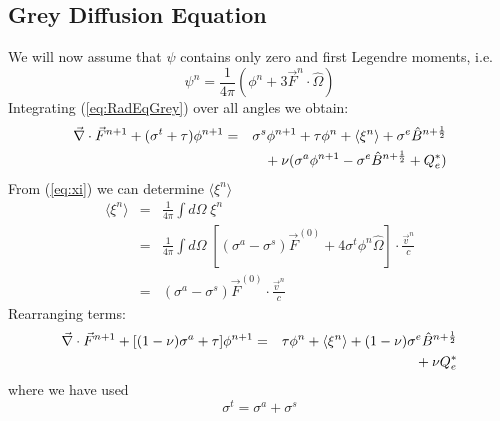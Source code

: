 \documentclass{article}
\newcommand{\Bnphlf}{\ensuremath{\hat{B}^{n+\frac{1}{2}}}}
\begin{document}
\subsection{Grey Diffusion Equation}

We will now assume that $\psi$ contains only zero and first Legendre moments,
i.e.\ 
\begin{equation}
        \psi^{n} = \frac{1}{4\pi} \left(
                        \phi^{n} + 3 \vec{F}^{n} \cdot \hat{\Omega}
                   \right)
\end{equation}
Integrating (\ref{eq:RadEqGrey}) over all angles
we obtain:
\begin{eqnarray}
\del \cdot \vec{F}^{n+1} + (\sigma^{t} + \tau) \phi^{n+1}
        &=& \sigma^{s}\phi^{n+1} + \tau \phi^{n}
        + \langle \xi^{n} \rangle
        + \sigma^{e} \Bnphlf 
        \nonumber \\
        & & \mbox{}
        + \nu (\sigma^{a}\phi^{n+1} - \sigma^{e}\Bnphlf + Q_{e}^{*})
\end{eqnarray}
From (\ref{eq:xi}) we can determine $\langle \xi^{n} \rangle$
\begin{eqnarray}
        \langle \xi^{n} \rangle &=&
                \frac{1}{4\pi} \int d\Omega \; \xi^{n}
                \\
                &=& \frac{1}{4\pi} \int d\Omega \;
                    \left[ (\sigma^{a} - \sigma^{s}) \vec{F}^{(0)}
                        + 4 \sigma^{t} \phi^{n} \hat{\Omega} \right]
                                \cdot \frac{\vec{v}^{n}}{c}
                \\
                 &=& (\sigma^{a} - \sigma^{s}) \vec{F}^{(0)}
                        \cdot \frac{\vec{v}^{n}}{c}
\label{eq:l_xi_r}
\end{eqnarray}
Rearranging terms:
\begin{eqnarray}
\del \cdot \vec{F}^{n+1} + [(1 - \nu) \sigma^{a} + \tau ] \phi^{n+1}
        &=& \tau \phi^{n}
        + \langle \xi^{n} \rangle
        + (1 - \nu) \sigma^{e} \Bnphlf  
        \nonumber \\
        & & \mbox{}
        + \nu Q_{e}^{*}
\label{eq:phiEq}
\end{eqnarray}
where we have used
\begin{equation}
        \sigma^{t} = \sigma^{a} + \sigma^{s}
\end{equation}
\end{document}
